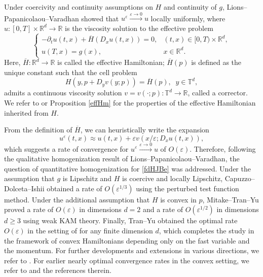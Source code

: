 \documentclass[reqno,11pt]{amsart}
\numberwithin{equation}{section}
\newcommand{\be}{\begin{equation}}
\newcommand{\ee}{\end{equation}}
\newcommand{\R}{\mathbb{R}} %
\newcommand{\e}{\varepsilon}
\newcommand{\T}{\mathbb{T}}
\newcommand{\nd}{\noindent}
\begin{document}
\nd
Under coercivity and continuity assumptions on $H$ and continuity of $g$,
Lions--Papanicolaou--Varadhan \cite{LionsPapaVara1987} showed that
$u^\e\xrightarrow{\e\to 0} u$ locally uniformly, where $u\colon [0,T]\times \R^d\to \R$
is the viscosity solution to the effective problem
\be\label{fdeffHJB}\nonumber
\begin{cases}
    -\partial_tu(t,x)+\overline{H}(D_xu(t,x))=0,&(t,x)\in [0,T)\times\R^d,\\
    u(T,x)=g(x),&x\in \R^d.
\end{cases}
\ee
Here, $\overline{H}\colon \R^d\to \R$ is called the effective Hamiltonian;
$\overline{H}(p)$ is defined as the unique constant such that the cell problem
\be\label{cellintro}
    H(y,p+D_y v(y;p))=\overline{H}(p),\;\; y\in \T^d,
\ee
admits a continuous viscosity solution $v=v(\cdot;p)\colon\T^d\to \R$,
called a corrector. We refer to \cite[Section 3]{tran_hamilton-jacobi_2021}
or Proposition \ref{effHm} for the properties of the effective Hamiltonian
inherited from $H$.
\vspace{1mm}

\nd
From the definition of $\overline{H}$, we can heuristically write the expansion
\be\label{heuristicexp}
u^\e(t,x)\approx u(t,x)+\e v(x/\e;D_xu(t,x)),
\ee
which suggests a rate of convergence for $u^\e\xrightarrow{\e\to 0}u$ of $O(\e)$. Therefore, following the qualitative homogenization result of Lions--Papanicolaou--Varadhan, the question of quantitative homogenization for \eqref{fdHJBe} was addressed. Under the assumption that $g$ is Lipschitz and $H$ is coercive and locally Lipschitz, Capuzzo--Dolceta--Ishii \cite{capuzzo2001rate} obtained a rate of $O(\e^{1/3})$ using the perturbed test function method. Under the additional assumption that $H$ is convex in $p$, Mitake--Tran--Yu \cite{MitakeTranYu2019} proved a rate of $O(\e)$ in dimensions $d=2$ and a rate of $O(\e^{1/2})$ in dimensions $d\ge 3$ using weak KAM theory. Finally, Tran--Yu \cite{TranYu2021} obtained the optimal rate $O(\e)$ in the setting of \cite{MitakeTranYu2019} for any finite dimension $d$, which completes the study in the framework of convex Hamiltonians depending only on the fast variable and the momentum. For further developments and extensions in various directions, we refer to \cite{HanJang2023, HanJingMitakeTran2025, MitakeNi2026, HanTu2025, MitakeSato2023, MitakeNi2025, HuTuZhang2025, MitakeNiTran2025}. For earlier nearly optimal convergence rates in the convex setting, we refer to \cite{Son2020, Cooperman2022} and the references therein.
\vspace{1mm}
\end{document}
